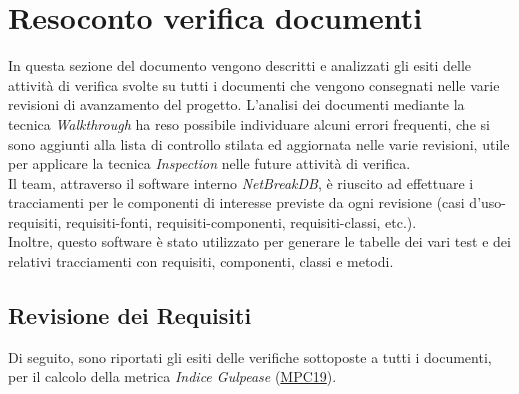 \newpage
\section{Resoconto verifica documenti}

In questa sezione del documento vengono descritti e analizzati gli esiti delle attività di verifica svolte su tutti i documenti che vengono consegnati nelle varie revisioni di avanzamento del progetto.
L’analisi dei documenti mediante la tecnica \textit{Walkthrough} ha reso possibile individuare alcuni errori frequenti, che si sono aggiunti alla lista di controllo stilata ed aggiornata nelle varie revisioni, utile per applicare la tecnica \textit{Inspection} nelle future attività di verifica.\\
Il team, attraverso il software interno \textit{NetBreakDB}, è riuscito ad effettuare i tracciamenti per le componenti di interesse previste da ogni revisione (casi d’uso-requisiti, requisiti-fonti, requisiti-componenti, requisiti-classi, etc.).\\
Inoltre, questo software è stato utilizzato per generare le tabelle dei vari test e dei relativi tracciamenti con requisiti, componenti, classi e metodi.
	
	\subsection{Revisione dei Requisiti}
	Di seguito, sono riportati gli esiti delle verifiche sottoposte a tutti i documenti, per il calcolo della metrica \textit{Indice Gulpease} (\hyperlink{MPC19}{MPC19}).
	
